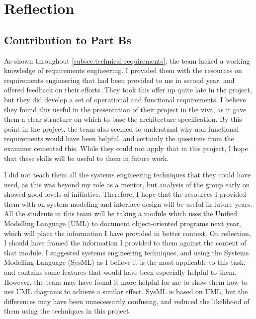 

\section{Reflection}\label{sec:reflection}
    \subsection{Contribution to Part Bs}\label{subsec:reflection-partBs}
        As shown throughout \autoref{subsec:technical-requirements}, the team lacked a working knowledge of requirements engineering.
        I provided them with the resources on requirements engineering that had been provided to me in second year, and offered feedback on their efforts.
        They took this offer up quite late in the project, but they did develop a set of operational and functional requirements.
        I believe they found this useful in the presentation of their project in the viva, as it gave them a clear structure on which to base the architecture specification.
        By this point in the project, the team also seemed to understand why non-functional requirements would have been helpful, and certainly the questions from the examiner cemented this.
        While they could not apply that in this project, I hope that these skills will be useful to them in future work.

        I did not teach them all the systems engineering techniques that they could have used, as this was beyond my role as a mentor, but analysis of the group early on showed good levels of initiative.
        Therefore, I hope that the resources I provided them with on system modeling and interface design will be useful in future years.
        All the students in this team will be taking a module which uses the Unified Modelling Language (UML) to document object-oriented programs next year, which will place the information I have provided in better context.
        On reflection, I should have framed the information I provided to them against the content of that module.
        I suggested systems engineering techniques, and using the Systems Modelling Language (SysML) as I believe it is the most applicable to this task, and contains some features that would have been especially helpful to them.
        However, the team may have found it more helpful for me to show them how to use UML diagrams to achieve a similar effect.
        SysML is based on UML, but the differences may have been unnecessarily confusing, and reduced the likelihood of them using the techniques in this project.

